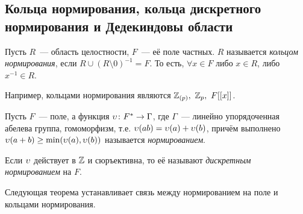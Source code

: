 
	\subsection{Кольца нормирования, кольца дискретного нормирования и Дедекиндовы области}

	\begin{definition} 
		Пусть $R$~--- область целостности, $F$~--- её поле частных. $R$ называется \emph{кольцом нормирования}, если $R \cup (R \setminus 0)^{-1} = F$. То есть, $\forall x \in F$  либо $x \in R$, либо $x^{-1} \in R$.
	\end{definition}

	\begin{example}
		Например, кольцами нормирования являются $\mathbb{Z}_{(p)}, \ \mathbb{Z}_{p}, \ F[[x]]$. 
	\end{example}

	\begin{definition} 
		Пусть $F$~--- поле, а функция $\upsilon\colon F^{*} \to \Gamma$, где $\Gamma$~--- линейно упорядоченная абелева группа, гомоморфизм, т.е. $\upsilon(ab) = \upsilon(a) + \upsilon(b)$, причём выполнено 
		$\upsilon(a + b) \ge \min(\upsilon(a), \upsilon(b))$ называется \emph{нормированием}.

		Если $\upsilon$ действует в $\mathbb{Z}$ и сюръективна, то её называют \emph{дискретным нормированием} на $F$.
	\end{definition}

	Следующая теорема устанавливает связь между нормированием на поле и кольцами нормирования. 

